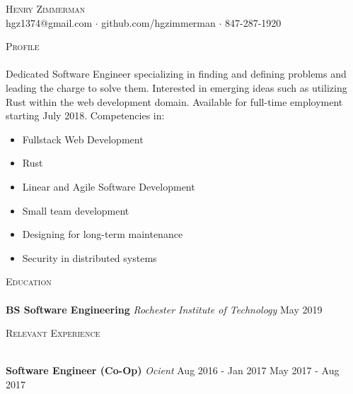 \documentclass[a4paper]{article}
\newcommand{\lineunder} {
    \vspace*{-8pt} \\
    \hspace*{-18pt} \hrulefill \\
}
\newcommand{\header} [1] {
    {\hspace*{-18pt}\vspace*{6pt} \textsc{#1}}
    \vspace*{-6pt} \lineunder
}
\begin{document}
\vspace*{-40pt}

    

\vspace*{-10pt}
\begin{center}
	{\Huge \scshape {Henry Zimmerman}}\\
	hgz1374@gmail.com $\cdot$ github.com/hgzimmerman $\cdot$ 847-287-1920 \\
\end{center}



\header{Profile}
Dedicated Software Engineer specializing in finding and defining problems and leading the charge to solve them.
Interested in emerging ideas such as utilizing Rust within the web development domain.
Available for full-time employment starting July 2018.
Competencies in:

\begin{multicols}{2}
\begin{itemize} \itemsep -1mm
    \item Fullstack Web Development
    \item Rust
    \item Linear and Agile Software Development
    \item Small team development
    \item Designing for long-term maintenance
    \item Security in distributed systems
\end{itemize}
\end{multicols}

\header{Education}
    \textbf{BS Software Engineering} \textit{Rochester Institute of Technology}  \hfill  May 2019\\
\vspace{2mm}

\header{Relevant Experience}
\vspace{1mm}

 
\textbf{Software Engineer (Co-Op)} \textit{Ocient} \hfill Aug 2016 - Jan 2017 \textbar{} May 2017 - Aug 2017\\
\end{document}
